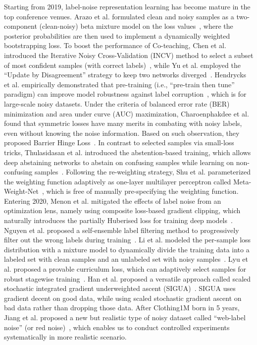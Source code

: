 Starting from 2019, label-noise representation learning has become mature in the top conference venues. Arazo et al. formulated clean and noisy samples as a two-component (clean-noisy) beta mixture model on the loss values~, where the posterior probabilities are then used to implement a dynamically weighted bootstrapping loss. To boost the performance of Co-teaching, Chen et al. introduced the Iterative Noisy Cross-Validation (INCV) method to select a subset of most confident samples (with correct labels)~, while Yu et al. employed the ``Update by Disagreement'' strategy to keep two networks diverged~. Hendrycks et al. empirically demonstrated that pre-training (i.e., ``pre-train then tune'' paradigm) can improve model robustness against label corruption~, which is for large-scale noisy datasets.
Under the criteria of balanced error rate (BER) minimization and area under curve (AUC) maximization, Charoenphakdee et al. found that symmetric losses have many merits in combating with noisy labels, even without knowing the noise information. Based on such observation, they proposed Barrier Hinge Loss~. In contrast to selected samples via small-loss tricks, Thulasidasan et al. introduced the abstention-based training, which allows deep abstaining networks to abstain on confusing samples while learning on non-confusing samples~. Following the re-weighting strategy, Shu et al. parameterized the weighting function adaptively as one-layer multilayer perceptron called Meta-Weight-Net~, which is free of manually pre-specifying the weighting function.
Entering 2020, Menon et al. mitigated the effects of label noise from an optimization lens, namely using composite loss-based gradient clipping, which naturally introduces the partially Huberised loss for training deep models~. Nguyen et al. proposed a self-ensemble label filtering method to progressively filter out the wrong labels during training~. Li et al. modeled the per-sample loss distribution with a mixture model to dynamically divide the training data into a labeled set with clean samples and an unlabeled set with noisy samples~. Lyu et al. proposed a provable curriculum loss, which can adaptively select samples for robust stagewise training~. Han et al. proposed a versatile approach called scaled stochastic integrated gradient underweighted ascent (SIGUA)~. SIGUA uses gradient decent on good data, while using scaled stochastic gradient ascent on bad data rather than dropping those data. After Clothing1M born in 5 years, Jiang et al. proposed a new but realistic type of noisy dataset called ``web-label noise'' (or red noise)~, which enables us to conduct controlled experiments systematically in more realistic scenario.



